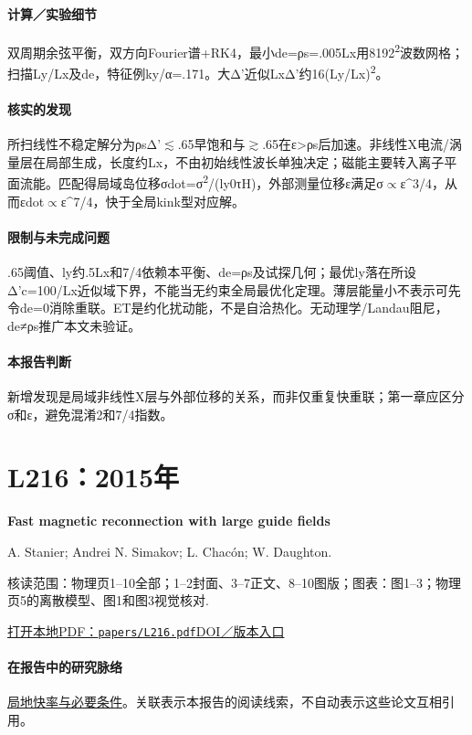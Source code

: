 \paragraph{计算／实验细节}双周期余弦平衡，双方向Fourier谱+RK4，最小de=ρs=.005Lx用8192\textsuperscript{2}波数网格；扫描Ly/Lx及de，特征例ky/α=.171。大Δ'近似LxΔ'约16(Ly/Lx)\textsuperscript{2}。

\paragraph{核实的发现}所扫线性不稳定解分为ρsΔ'\ensuremath{\lesssim}.65早饱和与\ensuremath{\gtrsim}.65在ε>ρs后加速。非线性X电流/涡量层在局部生成，长度约Lx，不由初始线性波长单独决定；磁能主要转入离子平面流能。匹配得局域岛位移σdot=σ\textsuperscript{2}/(ly0τH)，外部测量位移ε满足σ\ensuremath{\propto}ε\textasciicircum{}3/4，从而εdot\ensuremath{\propto}ε\textasciicircum{}7/4，快于全局kink型对应解。

\paragraph{限制与未完成问题}.65阈值、ly约.5Lx和7/4依赖本平衡、de=ρs及试探几何；最优ly落在所设Δ'c=100/Lx近似域下界，不能当无约束全局最优化定理。薄层能量小不表示可先令de=0消除重联。ET是约化扰动能，不是自洽热化。无动理学/Landau阻尼，de≠ρs推广本文未验证。

\paragraph{本报告判断}新增发现是局域非线性X层与外部位移的关系，而非仅重复快重联；第一章应区分σ和ε，避免混淆2和7/4指数。

\section{L216：2015年}\label{paper:L216}

\textbf{Fast magnetic reconnection with large guide fields}\citep{L216}\

A. Stanier;  Andrei N. Simakov;  L. Chacón;  W. Daughton.

\textsf{核读范围：}物理页1–10全部；1–2封面、3–7正文、8–10图版；\textsf{图表：}图1–3；物理页5的离散模型、图1和图3视觉核对.

\href{run:papers/L216.pdf}{打开本地PDF：\texttt{papers/L216.pdf}}\quad\href{https://doi.org/10.1063/1.4905629}{DOI／版本入口}

\paragraph{在报告中的研究脉络}\hyperref[story:fast]{局地快率与必要条件}。关联表示本报告的阅读线索，不自动表示这些论文互相引用。

